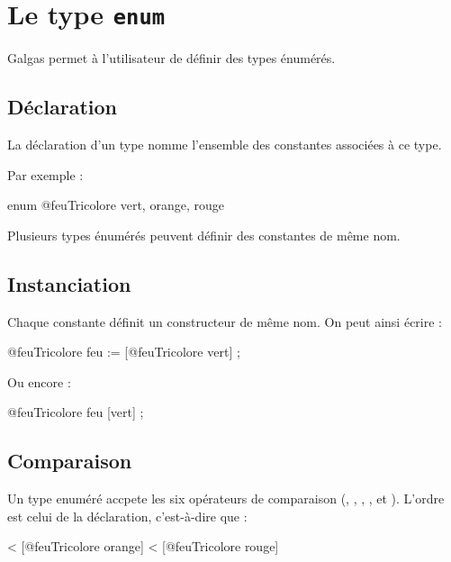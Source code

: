 
\chapter{Le type \texttt{enum}}

Galgas permet à l'utilisateur de définir des types énumérés.

\section{Déclaration}

La déclaration d'un type  nomme l'ensemble des constantes associées à ce type.

Par exemple :

\begin{galgascode}
enum @feuTricolore {
  vert, orange, rouge   
}
\end{galgascode}

Plusieurs types énumérés peuvent définir des constantes de même nom.

\section{Instanciation}

Chaque constante définit un constructeur de même nom. On peut ainsi écrire :

\begin{galgascode}
@feuTricolore feu := [@feuTricolore vert] ;
\end{galgascode}

Ou encore :

\begin{galgascode}
@feuTricolore feu [vert] ;
\end{galgascode}

\section{Comparaison}

Un type enuméré accpete les six opérateurs de comparaison (\galgas{==}, \galgas{\!=}, \galgas{<}, \galgas{<=}, \galgas{>} et \galgas{>}). L'ordre est celui de la déclaration, c'est-à-dire que :
\begin{galgascode}
   < [@feuTricolore orange] < [@feuTricolore rouge]
\end{galgascode}


